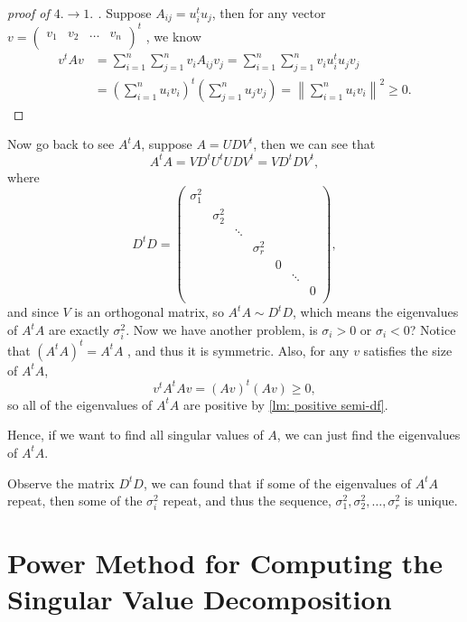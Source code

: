 \begin{proof}[proof of \(4. \to 1.\) ]
  Suppose \(A_{ij} = u_i^t u_j\), then for any vector \(v = \begin{pmatrix}
    v_1 & v_2 & \dots  &v_n   \\
  \end{pmatrix}^t\) , we know 
  \begin{align*}
    v^t A v &= \sum_{i=1}^n \sum_{j=1}^n v_i A_{ij} v_j =  \sum_{i=1}^n \sum_{j=1}^n v_i u_i^t u_j v_j  \\
    &= \left( \sum_{i=1}^n u_i v_i \right)^t \left(  \sum_{j=1}^n u_j v_j \right) = \left\lVert \sum_{i=1}^n u_i v_i \right\rVert^2 \ge 0.   
  \end{align*}
\end{proof}

Now go back to see \(A^t A\), suppose \(A = UDV^t\), then we can see that 
\[
  A^t A = V D^t U^t U D V^t = V D^t D V^t,
\]  
where
\[
  D^t D = \begin{pmatrix}
    \sigma _1^2 &  &  &  &&& \\
     &\sigma_2^2 & &  &&& \\
     &  &\ddots  &  &&&\\
     &  &  &\sigma _r^2  &&&\\
     &&& & 0&& \\
     &&&&& \ddots& \\
     &&&&&&0 \\
  \end{pmatrix},
\] 
and since \(V\) is an orthogonal matrix, so \(A^t A \sim D^t D\), which means the eigenvalues of \(A^t A\) are exactly \(\sigma _i^2\). Now we have another problem, is \(\sigma_i > 0\) or \(\sigma _i < 0\)? Notice that \(\left( A^t A \right)^t = A^t A \)      , and thus it is symmetric. Also, for any \(v\) satisfies the size of \(A^t A\),  
\[
  v^t A^t A v = (Av)^t (Av) \ge 0,
\]
so all of the eigenvalues of \(A^t A\) are positive by \autoref{lm: positive semi-df}. 

Hence, if we want to find all singular values of \(A\), we can just find the eigenvalues of \(A^t A\). 

\begin{note}
  Observe the matrix \(D^t D\), we can found that if some of the eigenvalues of \(A^t A\) repeat, then some of the \(\sigma _i^2\) repeat, and thus the sequence, \(\sigma _1^2, \sigma _2^2, \dots , \sigma _r^2\) is unique.    
\end{note}

\section{Power Method for Computing the Singular Value Decomposition}

